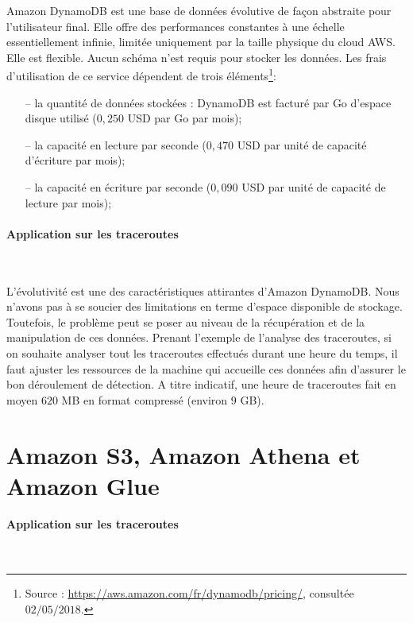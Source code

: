 Amazon DynamoDB  est une base de données évolutive de façon abstraite pour l'utilisateur final. Elle offre des performances constantes à une échelle essentiellement infinie, limitée uniquement par la taille physique du cloud AWS. Elle est flexible. Aucun schéma n'est requis pour stocker les données. Les frais d'utilisation de ce service dépendent de trois éléments\footnote{Source : \url{https://aws.amazon.com/fr/dynamodb/pricing/}, consultée $02/05/2018$.}:
\begin{itemize}
	\item[--] la quantité de données stockées : DynamoDB est facturé par Go d'espace disque utilisé ($ 0,250 $ USD par Go par mois);
	\item[--] la capacité en lecture par seconde ($ 0,470 $ USD par unité de capacité d'écriture par mois);
	\item[--]  la capacité en écriture par seconde ($ 0,090 $ USD par unité de capacité de lecture par mois);
\end{itemize}


\paragraph{Application sur les traceroutes}~


L'évolutivité est une des caractéristiques attirantes d'Amazon DynamoDB. Nous n'avons pas à se soucier des limitations en terme d'espace disponible de stockage. Toutefois, le problème peut se poser au niveau de la récupération et de la manipulation de ces données. Prenant l'exemple de l'analyse des traceroutes, si on souhaite analyser tout les traceroutes effectués durant une heure du temps, il faut ajuster les ressources de la machine qui accueille ces données afin d'assurer le bon déroulement de détection. A titre indicatif, une heure de traceroutes fait en moyen $620$ MB en format compressé (environ $9$ GB).




\section{Amazon S3, Amazon Athena et Amazon Glue }


\paragraph{Application sur les traceroutes}~

